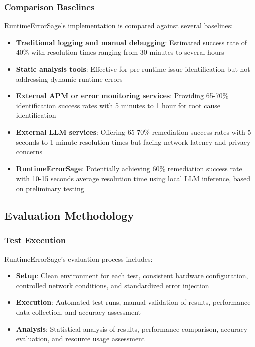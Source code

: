 \subsubsection{Comparison Baselines}
RuntimeErrorSage's implementation is compared against several baselines:

\begin{itemize}
\item \textbf{Traditional logging and manual debugging}: Estimated success rate of 40\% with resolution times ranging from 30 minutes to several hours
\item \textbf{Static analysis tools}: Effective for pre-runtime issue identification but not addressing dynamic runtime errors
\item \textbf{External APM or error monitoring services}: Providing 65-70\% identification success rates with 5 minutes to 1 hour for root cause identification
\item \textbf{External LLM services}: Offering 65-70\% remediation success rates with 5 seconds to 1 minute resolution times but facing network latency and privacy concerns~\cite{cloud_llm_latency_2022}
\item \textbf{RuntimeErrorSage}: Potentially achieving 60\% remediation success rate with 10-15 seconds average resolution time using local LLM inference, based on preliminary testing
\end{itemize}

\subsection{Evaluation Methodology}

\subsubsection{Test Execution}
RuntimeErrorSage's evaluation process includes:

\begin{itemize}
\item \textbf{Setup}: Clean environment for each test, consistent hardware configuration, controlled network conditions, and standardized error injection
\item \textbf{Execution}: Automated test runs, manual validation of results, performance data collection, and accuracy assessment
\item \textbf{Analysis}: Statistical analysis of results, performance comparison, accuracy evaluation, and resource usage assessment
\end{itemize}

